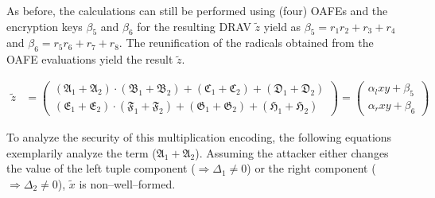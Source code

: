\noindent{}As before, the calculations can still be performed using (four)
OAFEs and the encryption keys $\beta_5$ and $\beta_6$ for the resulting DRAV
$\widetilde{z}$ yield as $\beta_5 = r_1r_2 + r_3 + r_4$ and $\beta_6 = r_5r_6 +
r_7 + r_8$. The reunification of the radicals obtained from the OAFE evaluations
yield the result $\widetilde{z}$.

\begin{align*}
  \widetilde{z} & =
  \begin{pmatrix}%
    (\mathfrak{A}_1+\mathfrak{A}_2) \cdot
    (\mathfrak{B}_1+\mathfrak{B}_2) +
    (\mathfrak{C}_1+\mathfrak{C}_2) +
    (\mathfrak{D}_1+\mathfrak{D}_2)\\
    (\mathfrak{E}_1+\mathfrak{E}_2) \cdot
    (\mathfrak{F}_1+\mathfrak{F}_2) +
    (\mathfrak{G}_1+\mathfrak{G}_2) +
    (\mathfrak{H}_1+\mathfrak{H}_2)
  \end{pmatrix}
   =
   \begin{pmatrix}
     \alpha_l xy + \beta_5 \\
     \alpha_r xy + \beta_6
   \end{pmatrix}
\end{align*}

\noindent{}To analyze the security of this multiplication encoding, the
following equations exemplarily analyze the term ($\mathfrak{A}_1 +
\mathfrak{A}_2$). Assuming the attacker either changes the value of the left
tuple component ($\Rightarrow \Delta_1 \neq 0$) or the right component
($\Rightarrow \Delta_2 \neq 0$), $\widetilde{x}$ is non--well--formed.

